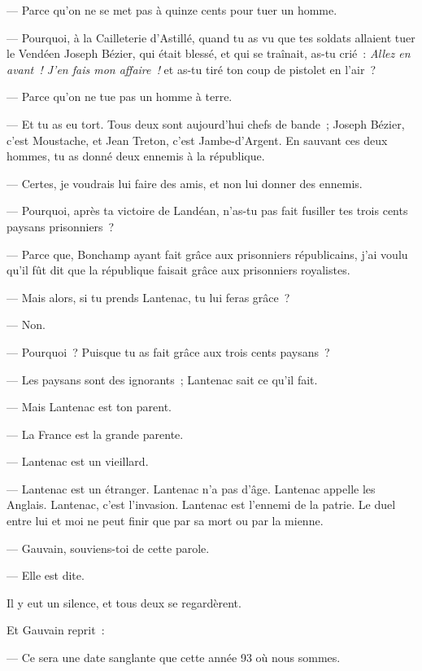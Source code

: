 \documentclass[french,twoside]{book} %
\begin{document}
— Parce qu’on ne se met pas à quinze cents pour tuer un homme.\par
— Pourquoi, à la Cailleterie d’Astillé, quand tu as vu que tes soldats allaient tuer le Vendéen Joseph Bézier, qui était blessé, et qui se traînait, as-tu crié : \emph{Allez en avant ! J’en fais mon affaire !} et as-tu tiré ton coup de pistolet en l’air ?\par
— Parce qu’on ne tue pas un homme à terre.\par
— Et tu as eu tort. Tous deux sont aujourd’hui chefs de bande ; Joseph Bézier, c’est Moustache, et Jean Treton, c’est Jambe-d’Argent. En sauvant ces deux hommes, tu as donné deux ennemis à la république.\par
 — Certes, je voudrais lui faire des amis, et non lui donner des ennemis.\par
— Pourquoi, après ta victoire de Landéan, n’as-tu pas fait fusiller tes trois cents paysans prisonniers ?\par
— Parce que, Bonchamp ayant fait grâce aux prisonniers républicains, j’ai voulu qu’il fût dit que la république faisait grâce aux prisonniers royalistes.\par
— Mais alors, si tu prends Lantenac, tu lui feras grâce ?\par
— Non.\par
— Pourquoi ? Puisque tu as fait grâce aux trois cents paysans ?\par
— Les paysans sont des ignorants ; Lantenac sait ce qu’il fait.\par
— Mais Lantenac est ton parent.\par
— La France est la grande parente.\par
— Lantenac est un vieillard.\par
— Lantenac est un étranger. Lantenac n’a pas d’âge. Lantenac appelle les Anglais. Lantenac, c’est l’invasion. Lantenac est l’ennemi de la patrie. Le duel entre lui et moi ne peut finir que par sa mort ou par la mienne.\par
— Gauvain, souviens-toi de cette parole.\par
— Elle est dite.\par
Il y eut un silence, et tous deux se regardèrent.\par
Et Gauvain reprit :\par
— Ce sera une date sanglante que cette année 93 où nous sommes.\par
\end{document}
